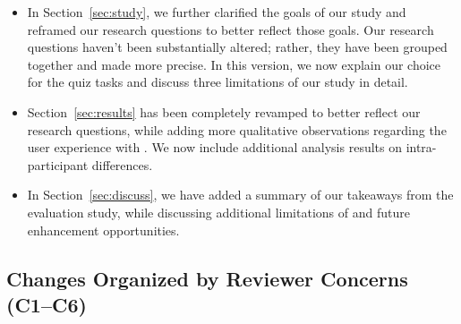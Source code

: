 \begin{itemize}
\item 
In Section~\ref{sec:study}, 
we further clarified the goals of our study
and reframed our research questions to 
better reflect those goals. 
Our research questions haven't been substantially altered;
rather, they have been grouped together and made more precise. 
In this version,
we now explain our choice
for the quiz tasks and discuss 
three limitations of our study in detail. 
\item Section~\ref{sec:results} has been completely
revamped to better reflect our research questions,
while adding more qualitative observations 
regarding the user experience with \noah. 
We now
include additional analysis results on intra-participant differences. 
\item In Section~\ref{sec:discuss}, we have added a summary of our takeaways from the evaluation study, while discussing additional limitations of \noah and future enhancement opportunities. 
\end{itemize}
\subsection*{Changes Organized by Reviewer Concerns (C1--C6)}


